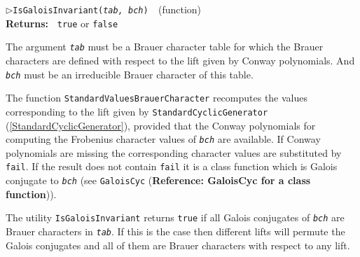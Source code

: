 \documentclass[a4paper,11pt]{report}
\begin{document}
{{{\noindent\textcolor{FuncColor}{$\triangleright$\enspace\texttt{IsGaloisInvariant({\mdseries\slshape tab, bch})
\label{IsGaloisInvariant}
}\hfill{\scriptsize (function)}}\\
\textbf{\indent Returns:\ }
\texttt{true} or \texttt{false}



 The argument \mbox{\texttt{\mdseries\slshape tab}} must be a Brauer character table for which the Brauer characters are defined
with respect to the lift given by Conway polynomials. And \mbox{\texttt{\mdseries\slshape bch}} must be an irreducible Brauer character of this table. 

 The function \texttt{StandardValuesBrauerCharacter} recomputes the values corresponding to the lift given by \texttt{StandardCyclicGenerator} (\ref{StandardCyclicGenerator}), provided that the Conway polynomials for computing the Frobenius character
values of \mbox{\texttt{\mdseries\slshape bch}} are available. If Conway polynomials are missing the corresponding character
values are substituted by \texttt{fail}. If the result does not contain \texttt{fail} it is a class function which is Galois conjugate to \mbox{\texttt{\mdseries\slshape bch}} (see \texttt{GaloisCyc} (\textbf{Reference: GaloisCyc for a class function})). 

 The utility \texttt{IsGaloisInvariant} returns \texttt{true} if all Galois conjugates of \mbox{\texttt{\mdseries\slshape bch}} are Brauer characters in \mbox{\texttt{\mdseries\slshape tab}}. If this is the case then different lifts will permute the Galois conjugates
and all of them are Brauer characters with respect to any lift. 

}}}
\end{document}
